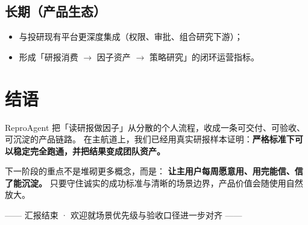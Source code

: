 \documentclass[UTF8,a4paper,11pt]{ctexart}
\begin{document}
\subsection{长期（产品生态）}

\begin{itemize}
  \item 与投研现有平台更深度集成（权限、审批、组合研究下游）；
  \item 形成「研报消费 $\rightarrow$ 因子资产 $\rightarrow$ 策略研究」的闭环运营指标。
\end{itemize}

\section{结语}

ReproAgent 把「读研报做因子」从分散的个人流程，收成一条可交付、可验收、可沉淀的产品链路。
在主航道上，我们已经用真实研报样本证明：\textbf{严格标准下可以稳定完全跑通，并把结果变成团队资产。}

下一阶段的重点不是堆砌更多概念，而是：
\textbf{让主用户每周愿意用、用完能信、信了能沉淀。}
只要守住诚实的成功标准与清晰的场景边界，产品价值会随使用自然放大。

\vspace{1.2cm}
\begin{center}
\color{muted}\small
—— 汇报结束 · 欢迎就场景优先级与验收口径进一步对齐 ——
\end{center}
\end{document}
